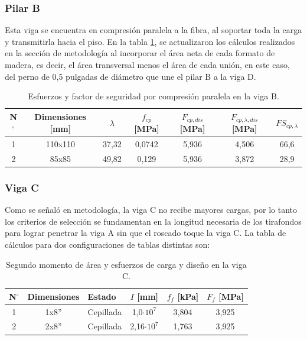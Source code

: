 \subsubsection{Pilar B}
Esta viga se encuentra en compresión paralela a la fibra, al soportar toda la carga y transmitirla hacia el piso. En la tabla \ref{tab:res_viga_b}, se actualizaron los cálculos realizados en la sección de metodología al incorporar el área neta de cada formato de madera, es decir, el área transversal menos el área de cada unión, en este caso, del perno de 0,5 pulgadas de diámetro que une el pilar B a la viga D.

\begin{table}[h]
\centering
\begin{tabular}{@{}ccccccc@{}}
\toprule
N$^{\circ}$ & Dimensiones [mm] & $\lambda$ & $f_{cp}$ [MPa] & $F_{cp,dis}$ [MPa] & $F_{cp,\lambda,dis}$ [MPa] & $FS_{cp,\lambda}$ \\ \midrule
1 & 110x110 & 37,32 & 0,0742 & 5,936 & 4,506 & 66,6 \\
2 & 85x85 & 49,82 & 0,129 & 5,936 & 3,872 & 28,9 \\ \bottomrule
\end{tabular}
\caption{Esfuerzos y factor de seguridad por compresión paralela en la viga B.}
\label{tab:res_viga_b}
\end{table}

\subsubsection{Viga C}
Como se señaló en metodología, la viga C no recibe mayores cargas, por lo tanto los criterios de selección se fundamentan en la longitud necesaria de los tirafondos para lograr penetrar la viga A sin que el roscado toque la viga C. La tabla de cálculos para dos configuraciones de tablas distintas son:

\begin{table}[h]
\centering
\begin{tabular}{@{}cclccc@{}}
\toprule
N$^{\circ}$ & Dimensiones & Estado & $I$ [mm] & $f_f$ [kPa] & $F_f$ [MPa] \\ \midrule
1 & 1x8'' & Cepillada & 1,0$\cdot 10^7$ & 3,804 & 3,925 \\
2 & 2x8'' & Cepillada & 2,16$\cdot 10^7$ & 1,763 & 3,925 \\ \bottomrule
\end{tabular}
\caption{Segundo momento de área y esfuerzos de carga y diseño en la viga C.}
\label{tab:res_viga_c}
\end{table}

